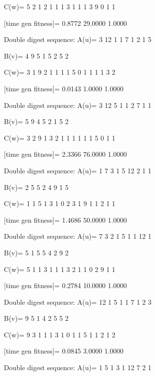 C(w)=
     5     2     1     2     1     1     1     3     1     1     1     3     9     0     1     1

[time gen fitness]=
    0.8772   29.0000    1.0000

Double digest sequence:
A(u)=
     3    12     1     1     7     1     2     1     5

B(v)=
     4     9     5     1     5     2     5     2

C(w)=
     3     1     9     2     1     1     1     1     5     0     1     1     1     1     3     2

[time gen fitness]=
    0.0143    1.0000    1.0000

Double digest sequence:
A(u)=
     3    12     5     1     1     2     7     1     1

B(v)=
     5     9     4     5     2     1     5     2

C(w)=
     3     2     9     1     3     2     1     1     1     1     1     1     5     0     1     1

[time gen fitness]=
    2.3366   76.0000    1.0000

Double digest sequence:
A(u)=
     1     7     3     1     5    12     2     1     1

B(v)=
     2     5     5     2     4     9     1     5

C(w)=
     1     1     5     1     3     1     0     2     3     1     9     1     1     2     1     1

[time gen fitness]=
    1.4686   50.0000    1.0000

Double digest sequence:
A(u)=
     7     3     2     1     5     1     1    12     1

B(v)=
     5     1     5     5     4     2     9     2

C(w)=
     5     1     1     3     1     1     1     3     2     1     1     0     2     9     1     1

[time gen fitness]=
    0.2784   10.0000    1.0000

Double digest sequence:
A(u)=
    12     1     5     1     1     7     1     2     3

B(v)=
     9     5     1     4     2     5     5     2

C(w)=
     9     3     1     1     1     3     1     0     1     1     5     1     1     2     1     2

[time gen fitness]=
    0.0845    3.0000    1.0000

Double digest sequence:
A(u)=
     1     5     1     3     1    12     7     2     1

